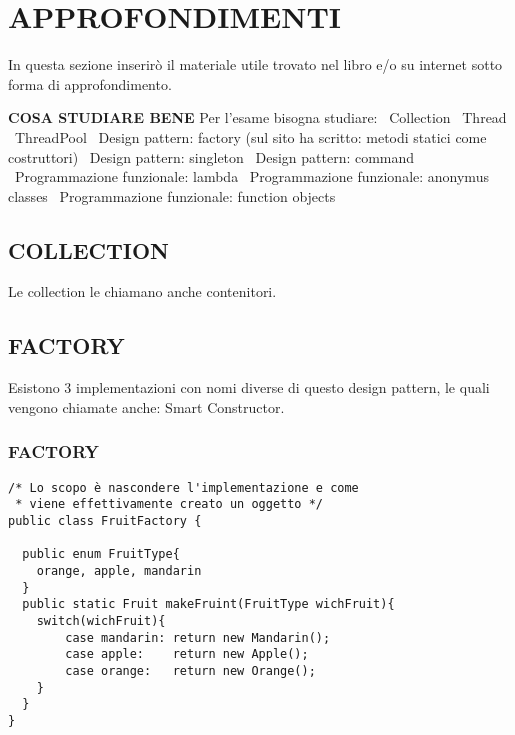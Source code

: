 

\newpage
\section{APPROFONDIMENTI}
In questa sezione inserirò il materiale utile trovato nel libro e/o su internet sotto forma di approfondimento. 


\noindent \textbf{COSA STUDIARE BENE} \newline
Per l'esame bisogna studiare: \newline
\textbullet\ Collection \newline
\textbullet\ Thread \newline
\textbullet\ ThreadPool \newline
\textbullet\ Design pattern: factory (sul sito ha scritto: metodi statici come costruttori)\newline
\textbullet\ Design pattern: singleton \newline
\textbullet\ Design pattern: command \newline
\textbullet\ Programmazione funzionale: lambda \newline
\textbullet\ Programmazione funzionale: anonymus classes \newline
\textbullet\ Programmazione funzionale: function objects \newline


\subsection{COLLECTION}
\noindent Le collection le chiamano anche contenitori.


\subsection{FACTORY}
Esistono 3 implementazioni con nomi diverse di questo design pattern, le quali vengono chiamate anche: Smart Constructor. \newline
\subsubsection{FACTORY}
\begin{lstlisting}
/* Lo scopo è nascondere l'implementazione e come
 * viene effettivamente creato un oggetto */
public class FruitFactory {

  public enum FruitType{
  	orange, apple, mandarin
  }
  public static Fruit makeFruint(FruitType wichFruit){
  	switch(wichFruit){
  		case mandarin: return new Mandarin();
  		case apple:    return new Apple();
  		case orange:   return new Orange();
  	}
  }
}
\end{lstlisting}

